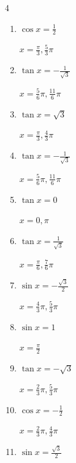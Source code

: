 \begin{multicols}{4}
\begin{enumerate}
        $\displaystyle x = \frac{\pi}{2} , \frac{3}{2}\pi$

  \item $\displaystyle \cos{x}  = \frac{1}{2}$

        $\displaystyle x = \frac{\pi}{3} , \frac{5}{3}\pi$

  \item $\displaystyle \tan{x}  = -\frac{1}{\sqrt{3}}$

        $\displaystyle x = \frac{5}{6}\pi , \frac{11}{6}\pi$

  \item $\displaystyle \tan{x}  = \sqrt{3}$

        $\displaystyle x = \frac{\pi}{3} , \frac{4}{3}\pi$

  \item $\displaystyle \tan{x}  = -\frac{1}{\sqrt{3}}$

        $\displaystyle x = \frac{5}{6}\pi , \frac{11}{6}\pi$

  \item $\displaystyle \tan{x}  = 0$

        $\displaystyle x = 0 , \pi$

  \item $\displaystyle \tan{x}  = \frac{1}{\sqrt{3}}$

        $\displaystyle x = \frac{\pi}{6} , \frac{7}{6}\pi$

\columnbreak %

\resetques

  \item $\displaystyle \sin{x}  = -\frac{\sqrt{3}}{2}$

        $\displaystyle x = \frac{4}{3}\pi , \frac{5}{3}\pi$

  \item $\displaystyle \sin{x}  = 1$

        $\displaystyle x = \frac{\pi}{2}$

  \item $\displaystyle \tan{x}  = -\sqrt{3}$

        $\displaystyle x = \frac{2}{3}\pi , \frac{5}{3}\pi$

  \item $\displaystyle \cos{x}  = -\frac{1}{2}$

        $\displaystyle x = \frac{2}{3}\pi , \frac{4}{3}\pi$

  \item $\displaystyle \sin{x}  = \frac{\sqrt{3}}{2}$


\end{enumerate}
\end{multicols}
